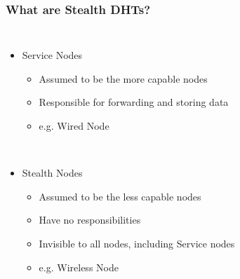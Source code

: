 \documentclass{beamer}
\begin{document}
\begin{frame}
  \frametitle{What are Stealth DHTs?}
  \begin{columns}

    \column{4.5cm}

    \column{6cm}
    \begin{itemize}
      \item Service Nodes
      \begin{itemize}
          \item Assumed to be the more capable nodes
          \item Responsible for forwarding and storing data
          \item e.g. \alert{Wired Node}
      \end{itemize}
      ~\\
      \item Stealth Nodes
      \begin{itemize}
          \item Assumed to be the less capable nodes
          \item Have no responsibilities
          \item Invisible to all nodes, including Service nodes
          \item e.g. \alert{Wireless Node}
      \end{itemize}
    \end{itemize}

  \end{columns}
\end{frame}
\end{document}
